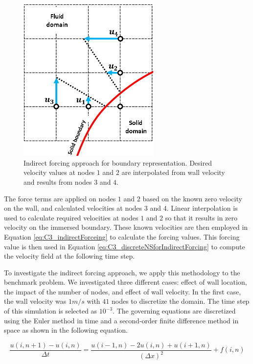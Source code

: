 \begin{figure}[H]
    \centering
    \includegraphics[width=7.00cm]{Chapter_3/figure/indirect_forcing_approach.png}
    \caption{Indirect forcing approach for boundary representation. Desired velocity values at nodes $1$ and $2$ are interpolated from wall velocity and results from nodes $3$ and $4$.}
    \label{fig:C3_indiredctForcingMethod}
\end{figure}

The force terms are applied on nodes $1$ and $2$ based on the known zero velocity on the wall, and calculated velocities at nodes $3$ and $4$. Linear interpolation is used to calculate required velocities at nodes $1$ and $2$ so that it results in zero velocity on the immersed boundary. These known velocities are then employed in Equation \ref{eq:C3_indirectForceing} to calculate the forcing values. This forcing value is then used in Equation \ref{eq:C3_discreteNSforIndirectForcing} to compute the velocity field at the following time step.

To investigate the indirect forcing approach, we apply this methodology to the benchmark problem. We investigated three different cases: effect of wall location, the impact of the number of nodes, and effect of wall velocity. In the first case, the wall velocity was $1 m/s$ with $41$ nodes to discretize the domain. The time step of this simulation is selected as $10^{-3}$. The governing equations are discretized using the Euler method in time and a second-order finite difference method in space as shown in the following equation.

\begin{equation}
    \frac{u(i, n+1) - u(i, n)}{\Delta t} = \frac{u(i - 1, n) - 2u(i, n) + u(i + 1, n)}{(\Delta x)^2} + f(i, n)
\end{equation}

